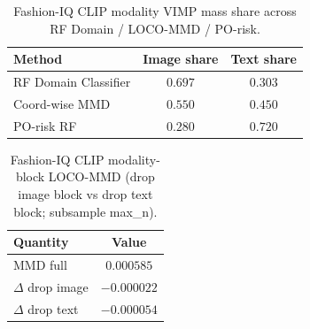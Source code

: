 \begin{table}[ht]
\centering
\caption{Fashion-IQ CLIP modality VIMP mass share across RF Domain / LOCO-MMD / PO-risk.}
\label{tab:fashion-iq-modality-mass}
\small
\begin{tabular}{@{}l cc@{}}
\toprule
Method & Image share & Text share \\
\midrule
RF Domain Classifier & $0.697$ & $0.303$ \\
Coord-wise MMD & $0.550$ & $0.450$ \\
PO-risk RF & $0.280$ & $0.720$ \\
\bottomrule
\end{tabular}
\end{table}

\begin{table}[ht]
\centering
\caption{Fashion-IQ CLIP modality-block LOCO-MMD (drop image block vs drop text block; subsample max\_n).}
\label{tab:fashion-iq-block-loco-mmd}
\small
\begin{tabular}{@{}l c@{}}
\toprule
Quantity & Value \\
\midrule
MMD full & $0.000585$ \\
$\Delta$ drop image & $-0.000022$ \\
$\Delta$ drop text & $-0.000054$ \\
\bottomrule
\end{tabular}
\end{table}
